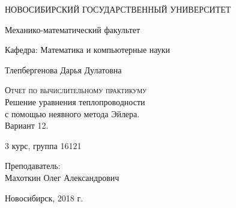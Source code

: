 \begin{titlepage}
  \begin{center}
     
    \vspace{0.5cm}
 
    НОВОСИБИРСКИЙ ГОСУДАРСТВЕННЫЙ УНИВЕРСИТЕТ
    \vspace{0.25cm}
     
    Механико-математический факультет
     
    Кафедра: Математика и компьютерные науки
    \vfill
     
     
    Тлепбергенова Дарья Дулатовна
    \vfill
 
    \textsc{Отчет по вычислительному практикуму}\\[5mm]
     
    {\LARGE Решение уравнения теплопроводности\\
      с помощью неявного метода Эйлера.\\
    Вариант 12.\\[2mm]}
  \bigskip
     
    3 курс, группа 16121
\end{center}
\vfill
 \newlength{\ML}
\hfill\begin{minipage}{0.4\textwidth}
  Преподаватель:\\
  Махоткин Олег Александрович
\end{minipage}%
\bigskip

 \vfill
\begin{center}
  Новосибирск, 2018 г.
\end{center}
\end{titlepage}